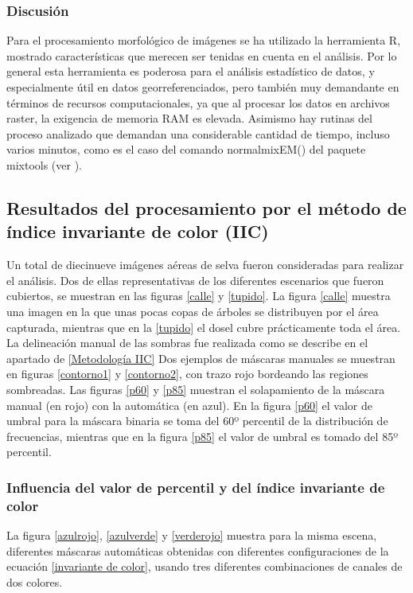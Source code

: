 \subsubsection{Discusión}
Para el procesamiento morfológico de imágenes se ha utilizado la herramienta R, mostrado características que merecen ser tenidas en cuenta en el análisis. Por lo general esta herramienta es poderosa para el análisis estadístico de datos, y especialmente útil en datos georreferenciados, pero también muy demandante en términos de recursos computacionales, ya que al procesar los datos en archivos raster, la exigencia de memoria RAM es elevada. Asimismo hay rutinas del proceso analizado que demandan una considerable cantidad de tiempo, incluso varios minutos, como es el caso del comando  normalmixEM() del paquete mixtools (ver \cite{young__aut_mixtools_2022}).


\subsection{Resultados del procesamiento por el método de índice invariante de color (IIC)} \label{Resultados IIC}
Un total de diecinueve imágenes aéreas de selva fueron consideradas para realizar el análisis. Dos de ellas representativas de los diferentes escenarios que fueron cubiertos, se muestran en las figuras \ref{calle} y \ref{tupido}. La figura \ref{calle} muestra una imagen en la que unas pocas copas de árboles se distribuyen por el área capturada, mientras que en la \ref{tupido} el dosel cubre prácticamente toda el área. La delineación manual de las sombras fue realizada como se describe en el apartado de \ref{Metodología IIC}
Dos ejemplos de máscaras manuales se muestran en figuras \ref{contorno1} y \ref{contorno2}, con trazo rojo bordeando las regiones sombreadas. Las figuras \ref{p60} y \ref{p85} muestran el solapamiento de la máscara manual (en rojo) con la automática (en azul). En la figura \ref{p60} el valor de umbral para la máscara binaria se toma del 60º percentil de la distribución de frecuencias, mientras que en la figura \ref{p85} el valor de umbral es tomado del 85º percentil.

\subsubsection{Influencia del valor de percentil y del índice invariante de color}

La figura \ref{azulrojo}, \ref{azulverde} y \ref{verderojo} muestra para la misma escena, diferentes máscaras automáticas obtenidas con diferentes configuraciones de la ecuación \ref{invariante de color}, usando tres diferentes combinaciones de canales de dos colores.

